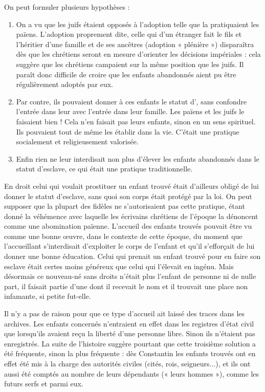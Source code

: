  On peut formuler plusieurs hypothèses :
\begin{enumerate}
\item On a vu que les juifs étaient opposés à l'adoption telle que la pratiquaient les païens. L'adoption proprement dite, celle qui d'un étranger fait le fils et l'héritier d'une famille et de ses ancêtres (adoption « plénière ») disparaîtra dès que les chrétiens seront en mesure d'orienter les décisions impériales : cela suggère que les chrétiens campaient sur la même position que les juifs. Il paraît donc difficile de croire que les enfants abandonnés aient pu être régulièrement adoptés par eux.
\item Par contre, ils pouvaient donner à ces enfants le statut d', sans confondre l'entrée dans leur  avec l'entrée dans leur famille. Les païens et les juifs le faisaient bien ! Cela n'en faisait pas leurs enfants, sinon en un sens spirituel. Ils pouvaient tout de même les établir dans la vie. C'était une pratique socialement et religieusement valorisée.
\item Enfin rien ne leur interdisait non plus d'élever les enfants abandonnés dans le statut d'esclave, ce qui était une pratique traditionnelle. 
\end{enumerate} 

 En droit celui qui voulait prostituer un enfant trouvé était d'ailleurs obligé de lui donner le statut d'esclave, sans quoi son corps était protégé par la loi. On peut supposer que la plupart des fidèles ne s'autorisaient pas cette pratique, étant donné la véhémence avec laquelle les écrivains chrétiens de l'époque la dénoncent comme une abomination païenne. L'accueil des enfants trouvés pouvait être vu comme une bonne œuvre, dans le contexte de cette époque, du moment que l'accueillant s'interdisait d'exploiter le corps de l'enfant et qu'il s'efforçait de lui donner une bonne éducation. Celui qui prenait un enfant trouvé pour en faire son esclave était certes moins généreux que celui qui l'élevait en ingénu. Mais désormais ce nouveau-né sans droits n'était plus l'enfant de personne ni de nulle part, il faisait partie d'une  dont il recevait le nom et il trouvait une place non infamante, si petite fut-elle.

 Il n'y a pas de raison pour que ce type d'accueil ait laissé des traces dans les archives. Les enfants concernés n'entraient en effet dans les registres d'état civil que lorsqu'ils avaient reçu la liberté d'une personne libre. Sinon ils n'étaient pas enregistrés. La suite de l'histoire suggère pourtant que cette troisième solution a été fréquente, sinon la plus fréquente : dès Constantin les enfants trouvés ont en effet été mis à la charge des autorités civiles (cités, rois, seigneurs...), et ils ont aussi été comptés au nombre de leurs dépendants (« leurs hommes »), comme les futurs serfs et parmi eux. 
 














